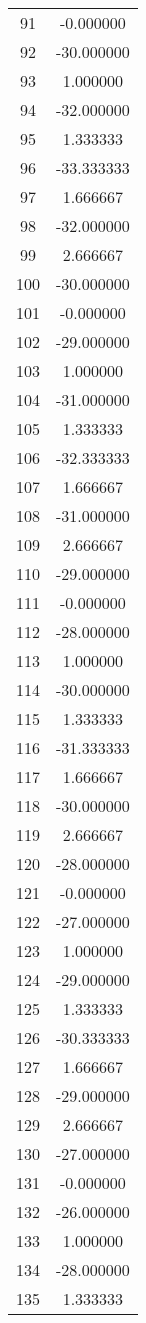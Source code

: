 \documentclass[12pt]{article}
\begin{document}
\begin{longtable}{@{}cc@{}}
91 & -0.000000 \\
92 & -30.000000 \\
93 & 1.000000 \\
94 & -32.000000 \\
95 & 1.333333 \\
96 & -33.333333 \\
97 & 1.666667 \\
98 & -32.000000 \\
99 & 2.666667 \\
100 & -30.000000 \\
101 & -0.000000 \\
102 & -29.000000 \\
103 & 1.000000 \\
104 & -31.000000 \\
105 & 1.333333 \\
106 & -32.333333 \\
107 & 1.666667 \\
108 & -31.000000 \\
109 & 2.666667 \\
110 & -29.000000 \\
111 & -0.000000 \\
112 & -28.000000 \\
113 & 1.000000 \\
114 & -30.000000 \\
115 & 1.333333 \\
116 & -31.333333 \\
117 & 1.666667 \\
118 & -30.000000 \\
119 & 2.666667 \\
120 & -28.000000 \\
121 & -0.000000 \\
122 & -27.000000 \\
123 & 1.000000 \\
124 & -29.000000 \\
125 & 1.333333 \\
126 & -30.333333 \\
127 & 1.666667 \\
128 & -29.000000 \\
129 & 2.666667 \\
130 & -27.000000 \\
131 & -0.000000 \\
132 & -26.000000 \\
133 & 1.000000 \\
134 & -28.000000 \\
135 & 1.333333 \\

\end{longtable}
\end{document}

